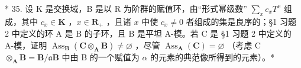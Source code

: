 * 35. 设 K 是交换域，B 是以 R 为阶群的赋值环，由``形式幂级数'' \(\sum_{x} c_{x} T^{x}\) 组成，其中 \(c_{x} \in \mathbf{K}\) ，\(x \in \mathbf{R}_{+}\) ，且诸 \(x\) 中使 \(c_{x} \neq 0\) 者组成的集是良序的；§1 习题 2 中定义的环 A 是 B 的子环，且 B 是平坦 A-模。若 C 是 §1 习题 2 中定义的 A-模，证明 \(\operatorname{Ass}_{\mathbf{B}}(\mathbf{C} \otimes_{\mathbf{A}} \mathbf{B}) \neq \varnothing\) ，尽管 \(\operatorname{Ass}_{\mathbf{A}}(\mathbf{C}) = \varnothing\) （考虑 C \(\otimes_{\mathbf{A}} \mathbf{B} = \mathbf{B}/\mathfrak{a}\mathbf{B}\) 中由 B 的一个赋值为 \(\alpha\) 的元素的典范像所得到的元素）。*

